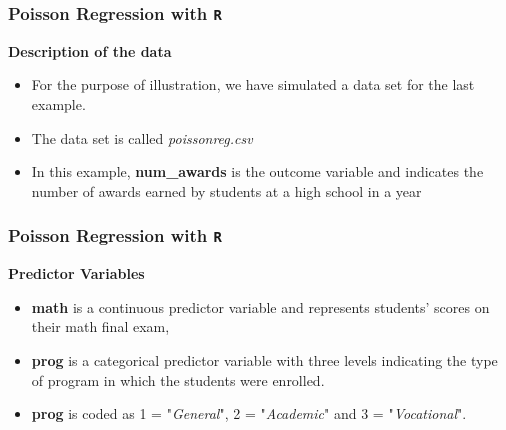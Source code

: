 \documentclass[00-GLMregslides.tex]{subfiles}
\begin{document}
\begin{frame}[fragile]

\frametitle{Poisson Regression with \texttt{R}}
\Large
\textbf{Description of the data}

\begin{itemize}
\item For the purpose of illustration, we have simulated a data set for the last example.

\item The data set is called \textit{poissonreg.csv}  

\item In this example, \textbf{num\_awards} is the outcome variable and indicates the number of awards earned by students at a high school in a year

\end{itemize}
\end{frame}
\begin{frame}[fragile]
	
	\frametitle{Poisson Regression with \texttt{R}}
	\Large
	\textbf{Predictor Variables}
\begin{itemize}
\item \textbf{math} is a continuous predictor variable and represents students' scores on their math final exam, \item \textbf{prog} is a categorical predictor variable with three levels indicating the type of program in which the students were enrolled.

\item  \textbf{prog} is coded as 1 = "\textit{General}",
 2 = "\textit{Academic}" and 3 = "\textit{Vocational}". 
\end{itemize}

\end{frame}

%
%
\end{document}
